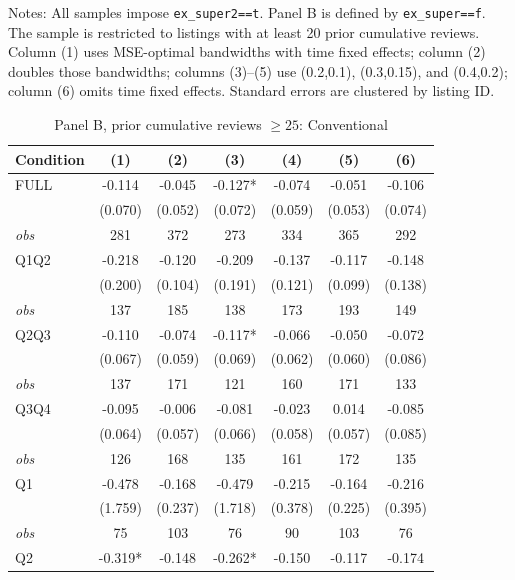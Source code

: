 \begin{table}[!htbp]
\begin{tabular}{lcccccc}
\bottomrule
\end{tabular}
\begin{minipage}{0.98\textwidth}\footnotesize
Notes: All samples impose \texttt{ex\_super2==t}. Panel B is defined by \texttt{ex\_super==f}. The sample is restricted to listings with at least 20 prior cumulative reviews. Column (1) uses MSE-optimal bandwidths with time fixed effects; column (2) doubles those bandwidths; columns (3)--(5) use (0.2,0.1), (0.3,0.15), and (0.4,0.2); column (6) omits time fixed effects. Standard errors are clustered by listing ID.
\end{minipage}
\end{table}

\begin{table}[!htbp]
\centering
\caption{Panel B, prior cumulative reviews $\geq25$: Conventional}
\begin{tabular}{lcccccc}
\toprule
Condition & (1) & (2) & (3) & (4) & (5) & (6) \\
\midrule
FULL & -0.114 & -0.045 & -0.127* & -0.074 & -0.051 & -0.106 \\
 & (0.070) & (0.052) & (0.072) & (0.059) & (0.053) & (0.074) \\
\textit{obs} & 281 & 372 & 273 & 334 & 365 & 292 \\
Q1Q2 & -0.218 & -0.120 & -0.209 & -0.137 & -0.117 & -0.148 \\
 & (0.200) & (0.104) & (0.191) & (0.121) & (0.099) & (0.138) \\
\textit{obs} & 137 & 185 & 138 & 173 & 193 & 149 \\
Q2Q3 & -0.110 & -0.074 & -0.117* & -0.066 & -0.050 & -0.072 \\
 & (0.067) & (0.059) & (0.069) & (0.062) & (0.060) & (0.086) \\
\textit{obs} & 137 & 171 & 121 & 160 & 171 & 133 \\
Q3Q4 & -0.095 & -0.006 & -0.081 & -0.023 & 0.014 & -0.085 \\
 & (0.064) & (0.057) & (0.066) & (0.058) & (0.057) & (0.085) \\
\textit{obs} & 126 & 168 & 135 & 161 & 172 & 135 \\
Q1 & -0.478 & -0.168 & -0.479 & -0.215 & -0.164 & -0.216 \\
 & (1.759) & (0.237) & (1.718) & (0.378) & (0.225) & (0.395) \\
\textit{obs} & 75 & 103 & 76 & 90 & 103 & 76 \\
Q2 & -0.319* & -0.148 & -0.262* & -0.150 & -0.117 & -0.174 \\

\end{tabular}
\end{table}
